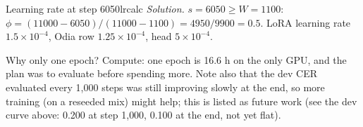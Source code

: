 \begin{exercise}{Learning rate at step 6050}{lrcalc}
\textit{Solution.} $s=6050\ge W=1100$: $\phi=(11000-6050)/(11000-1100)=4950/9900=0.5$. LoRA learning rate $1.5\times10^{-4}$, Odia row
$1.25\times10^{-4}$, head $5\times10^{-4}$.
\end{exercise}

\begin{vivatip}
Why only one epoch? Compute: one epoch is 16.6 h on the only GPU, and the plan was to evaluate before spending more. Note also that
the dev CER evaluated every 1{,}000 steps was still improving slowly at the end, so more training (on a reseeded mix) might help;
this is listed as future work (see the dev curve above: 0.200 at step 1{,}000, 0.100 at the end, not yet flat).
\end{vivatip}
